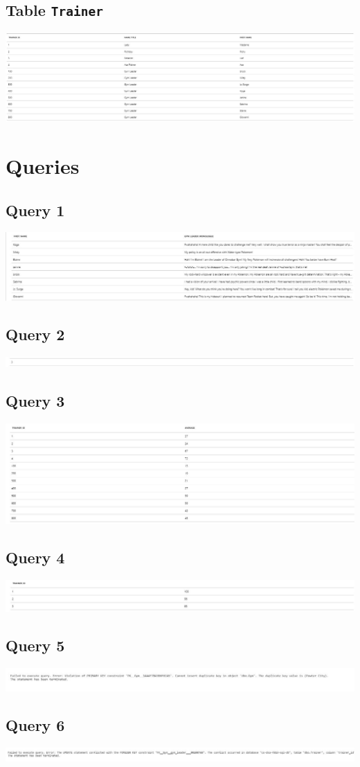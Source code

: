 \documentclass{article}
\begin{document}
 \subsection{Table \texttt{Trainer}}
 \includegraphics[width=\textwidth]{img/query-outputs/3_Trainer.JPG}
\section{Queries}
 \subsection{Query 1}
 \includegraphics[width=\textwidth]{img/query-outputs/3_Q1.JPG}
 \subsection{Query 2}
 \includegraphics[width=\textwidth]{img/query-outputs/3_Q2.JPG}
 \subsection{Query 3}
 \includegraphics[width=\textwidth]{img/query-outputs/3_Q3.JPG}
 \subsection{Query 4}
 \includegraphics[width=\textwidth]{img/query-outputs/3_Q4.JPG}
 \subsection{Query 5}
 \includegraphics[width=\textwidth]{img/query-outputs/3_Q5.JPG}
 \subsection{Query 6}
 \includegraphics[width=\textwidth]{img/query-outputs/3_Q6.JPG}
\end{document}
